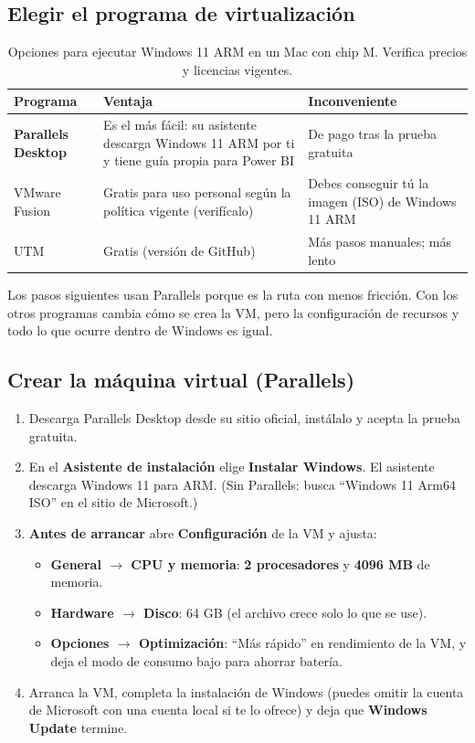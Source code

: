 \documentclass[11pt,letterpaper]{article}
\newcommand{\ui}[1]{\textbf{#1}}                 %
\begin{document}
\subsection{Elegir el programa de virtualización}

\begin{table}[H]
\centering
\caption{Opciones para ejecutar Windows 11 ARM en un Mac con chip M. Verifica precios y licencias vigentes.}
\begin{tabularx}{\linewidth}{l L L}
\toprule
Programa & Ventaja & Inconveniente \\
\midrule
\textbf{Parallels Desktop} & Es el más fácil: su asistente descarga Windows 11 ARM por ti y tiene guía propia para Power BI & De pago tras la prueba gratuita \\
VMware Fusion & Gratis para uso personal según la política vigente (verifícalo) & Debes conseguir tú la imagen (ISO) de Windows 11 ARM \\
UTM & Gratis (versión de GitHub) & Más pasos manuales; más lento \\
\bottomrule
\end{tabularx}
\end{table}

Los pasos siguientes usan Parallels porque es la ruta con menos fricción. Con los otros programas cambia cómo se crea la
VM, pero la configuración de recursos y todo lo que ocurre dentro de Windows es igual.

\subsection{Crear la máquina virtual (Parallels)}

\begin{enumerate}
  \item Descarga Parallels Desktop desde su sitio oficial, instálalo y acepta la prueba gratuita.
  \item En el \ui{Asistente de instalación} elige \ui{Instalar Windows}. El asistente descarga Windows 11 para ARM.
        (Sin Parallels: busca ``Windows 11 Arm64 ISO'' en el sitio de Microsoft.)
  \item \textbf{Antes de arrancar} abre \ui{Configuración} de la VM y ajusta:
  \begin{itemize}
    \item \ui{General $\rightarrow$ CPU y memoria}: \textbf{2 procesadores} y \textbf{4096 MB} de memoria.
    \item \ui{Hardware $\rightarrow$ Disco}: 64 GB (el archivo crece solo lo que se use).
    \item \ui{Opciones $\rightarrow$ Optimización}: ``Más rápido'' en rendimiento de la VM, y deja el modo de consumo bajo para ahorrar batería.
  \end{itemize}
  \item Arranca la VM, completa la instalación de Windows (puedes omitir la cuenta de Microsoft con una cuenta local si te lo ofrece) y deja que \ui{Windows Update} termine.
\end{enumerate}
\end{document}
